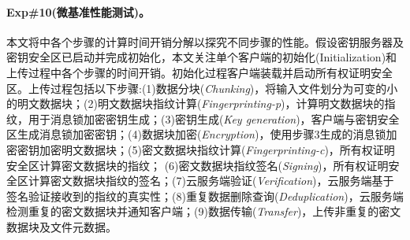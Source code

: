 \paragraph*{Exp\#10(微基准性能测试)。}本文将\sysnameS 中各个步骤的计算时间开销分解以探究不同步骤的性能。假设密钥服务器及密钥安全区已启动并完成初始化，本文关注单个客户端的初始化(Initialization)和上传过程中各个步骤的时间开销。初始化过程客户端装载并启动所有权证明安全区。上传过程包括以下步骤:(1)数据分块(\textit{Chunking})，将输入文件划分为可变的小的明文数据块；(2)明文数据块指纹计算(\textit{Fingerprinting-p})，计算明文数据块的指纹，用于消息锁加密密钥生成；(3)密钥生成(\textit{Key generation})，客户端与密钥安全区生成消息锁加密密钥；(4)数据块加密(\textit{Encryption})，使用步骤3生成的消息锁加密密钥加密明文数据块；(5)密文数据块指纹计算(\textit{Fingerprinting-c})，所有权证明安全区计算密文数据块的指纹； (6)密文数据块指纹签名(\textit{Signing})，所有权证明安全区计算密文数据块指纹的签名；(7)云服务端验证(\textit{Verification})，云服务端基于签名验证接收到的指纹的真实性；(8)重复数据删除查询(\textit{Deduplication})，云服务端检测重复的密文数据块并通知客户端；(9)数据传输(\textit{Transfer})，上传非重复的密文数据块及文件元数据。

